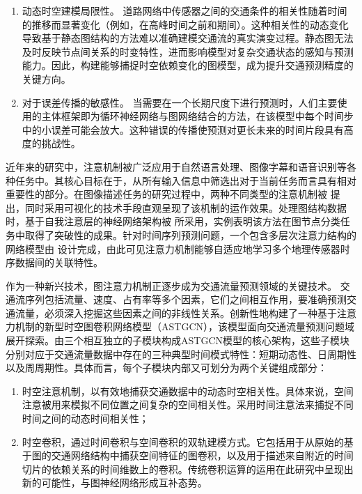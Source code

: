 \begin{enumerate}
  \item 动态时空建模局限性。
  道路网络中传感器之间的交通条件的相关性随着时间的推移而显著变化（例如，在高峰时间之前和期间）。这种相关性的动态变化导致基于静态图结构的方法难以准确建模交通流的真实演变过程。静态图无法及时反映节点间关系的时变特性，进而影响模型对复杂交通状态的感知与预测能力。因此，构建能够捕捉时空依赖变化的图模型，成为提升交通预测精度的关键方向。
  
  \item 对于误差传播的敏感性。
  当需要在一个长期尺度下进行预测时，人们主要使用的主体框架即为循环神经网络与图网络结合的方法，在该模型中每个时间步中的小误差可能会放大。这种错误的传播使预测对更长未来的时间片段具有高度的挑战性。
\end{enumerate}

近年来的研究中，注意机制被广泛应用于自然语言处理、图像字幕和语音识别等各种任务中。其核心目标在于，从所有输入信息中筛选出对于当前任务而言具有相对重要性的部分。在图像描述任务的研究过程中，两种不同类型的注意机制被 \textcite{2015_Xu_Show_attend_and_tell_Neural_image_caption_generation_with_visual_attention} 提出，同时采用可视化的技术手段直观呈现了该机制的运作效果。处理图结构数据时，基于自我注意层的神经网络架构被 \textcite{2018_Velickovic_Graph_attention_networks} 所采用，实例表明该方法在图节点分类任务中取得了突破性的成果。针对时间序列预测问题，一个包含多层次注意力结构的网络模型由 \textcite{2018_Liang_GeoMAN_Multi_level_Attention_Networks_for_Geo_sensory_Time_Series_Prediction} 设计完成，由此可见注意力机制能够自适应地学习多个地理传感器时序数据间的关联特性。

作为一种新兴技术，图注意力机制正逐步成为交通流量预测领域的关键技术。
交通流序列包括流量、速度、占有率等多个因素，它们之间相互作用，要准确预测交通流量，必须深入挖掘这些因素之间的非线性关系。\textcite{2019_Guo_Attention_based_spatial_temporal_graph_convolutional_networks_for_traffic_flow_forecasting}创新性地构建了一种基于注意力机制的新型时空图卷积网络模型（ASTGCN），该模型面向交通流量预测问题域展开探索。由三个相互独立的子模块构成ASTGCN模型的核心架构，这些子模块分别对应于交通流量数据中存在的三种典型时间模式特性：短期动态性、日周期性以及周周期性。具体而言，每个子模块内部又可划分为两个关键组成部分： 
\begin{enumerate}[(1)]
  \item 时空注意机制，以有效地捕获交通数据中的动态时空相关性。具体来说，空间注意被用来模拟不同位置之间复杂的空间相关性。采用时间注意法来捕捉不同时间之间的动态时间相关性；\item 时空卷积，通过时间卷积与空间卷积的双轨建模方式。它包括用于从原始的基于图的交通网络结构中捕获空间特征的图卷积，以及用于描述来自附近的时间切片的依赖关系的时间维数上的卷积。传统卷积运算的运用在此研究中呈现出新的可能性，与图神经网络形成互补态势。
\end{enumerate}

